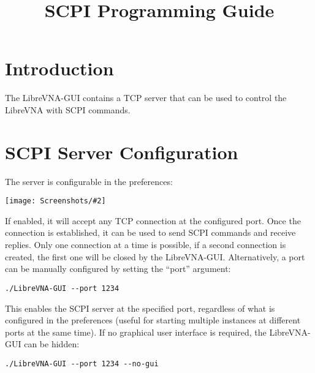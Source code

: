 \documentclass[a4paper,11pt]{article}
\title{\vna{} SCPI Programming Guide}
\newcommand{\vna}{LibreVNA}
\newcommand{\gui}{\vna{}-GUI}
\newcommand{\screenshot}[2]{\begin{center}
\texttt{[image: Screenshots/\#2]}
\end{center}}
\begin{document}
\maketitle

\setcounter{tocdepth}{4}
\setcounter{secnumdepth}{4}
\tableofcontents

\clearpage

\section{Introduction}
The \gui{} contains a TCP server that can be used to control the \vna{} with SCPI commands.
\section{SCPI Server Configuration}
The server is configurable in the preferences: 
\screenshot{0.3}{serverconfig.png}
If enabled, it will accept any TCP connection at the configured port. Once the connection is established, it can be used to send SCPI commands and receive replies. Only one connection at a time is possible, if a second connection is created, the first one will be closed by the \gui{}. Alternatively, a port can be manually configured by setting the ``port'' argument:
\begin{lstlisting}
./LibreVNA-GUI --port 1234
\end{lstlisting}
This enables the SCPI server at the specified port, regardless of what is configured in the preferences (useful for starting multiple instances at different ports at the same time). If no graphical user interface is required, the \gui{} can be hidden:
\begin{lstlisting}
./LibreVNA-GUI --port 1234 --no-gui
\end{lstlisting}
\end{document}
